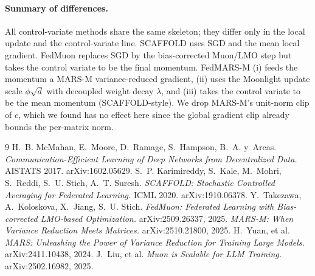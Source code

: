 \documentclass[11pt]{article}
\begin{document}
\paragraph{Summary of differences.}
All control-variate methods share the same skeleton; they differ only in the local
update and the control-variate line. SCAFFOLD uses SGD and the mean local gradient.
FedMuon replaces SGD by the bias-corrected Muon/LMO step but takes the control variate
to be the final momentum. FedMARS-M (i) feeds the momentum a MARS-M variance-reduced
gradient, (ii) uses the Moonlight update scale $\phi\sqrt{d}$ with decoupled weight
decay $\lambda$, and (iii) takes the control variate to be the mean momentum
(SCAFFOLD-style). We drop MARS-M's unit-norm clip of $c$, which we found has no effect
here since the global gradient clip already bounds the per-matrix norm.

\begin{thebibliography}{9}
 H.~B. McMahan, E.~Moore, D.~Ramage, S.~Hampson, B.~A. y~Arcas.
  \textit{Communication-Efficient Learning of Deep Networks from Decentralized Data.} AISTATS 2017. arXiv:1602.05629.
 S.~P. Karimireddy, S.~Kale, M.~Mohri, S.~Reddi, S.~U. Stich, A.~T. Suresh.
  \textit{SCAFFOLD: Stochastic Controlled Averaging for Federated Learning.} ICML 2020. arXiv:1910.06378.
 Y.~Takezawa, A.~Koloskova, X.~Jiang, S.~U. Stich.
  \textit{FedMuon: Federated Learning with Bias-corrected LMO-based Optimization.} arXiv:2509.26337, 2025.
 \textit{MARS-M: When Variance Reduction Meets Matrices.} arXiv:2510.21800, 2025.
 H.~Yuan, et al. \textit{MARS: Unleashing the Power of Variance Reduction for Training Large Models.} arXiv:2411.10438, 2024.
 J.~Liu, et al. \textit{Muon is Scalable for LLM Training.} arXiv:2502.16982, 2025.
\end{thebibliography}
\end{document}
